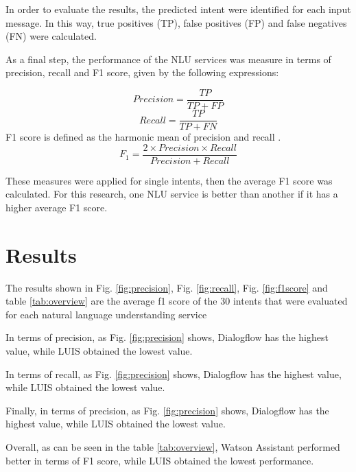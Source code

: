 \documentclass[conference]{IEEEtran}
\begin{document}
In order to evaluate the results, the predicted intent were identified for each input message. In this way, true positives (TP), false positives (FP) and false negatives (FN) were calculated.

As a final step, the performance of the NLU services was measure in terms of precision, recall and F1 score, given by the following expressions:

\begin{equation}
    Precision=\frac{TP}{TP+FP}\label{eq1}
\end{equation}
\begin{equation}
    Recall=\frac{TP}{TP+FN}\label{eq2}
\end{equation}
F1 score is defined as the harmonic mean of precision and recall \cite{campesato2020artificial}.
\begin{equation}
    F_{1} =\frac{2 \times Precision\times Recall}{Precision+Recall}\label{eq3}
\end{equation}

These measures were applied for single intents, then the average F1 score was calculated. For this research, one NLU service is better than another if it has a higher average F1 score.

\section{Results}

The results shown in Fig. \ref{fig:precision}, Fig. \ref{fig:recall}, Fig. \ref{fig:f1score} and table \ref{tab:overview} are the average f1 score of the 30 intents that were evaluated for each natural language understanding service

In terms of precision, as Fig. \ref{fig:precision} shows, Dialogflow has the highest value, while LUIS obtained the lowest value.

In terms of recall, as Fig. \ref{fig:precision} shows, Dialogflow has the highest value, while LUIS obtained the lowest value.

Finally, in terms of precision, as Fig. \ref{fig:precision} shows, Dialogflow has the highest value, while LUIS obtained the lowest value.

Overall, as can be seen in the table \ref{tab:overview}, Watson Assistant performed better in terms of F1 score, while LUIS obtained the lowest performance.
\end{document}
